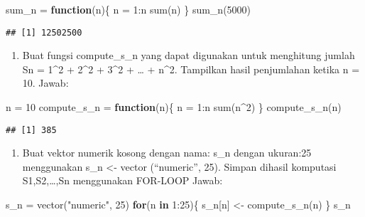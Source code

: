 \documentclass[
]{article}
\newenvironment{Shaded}{\begin{snugshade}}{\end{snugshade}}
\newcommand{\ControlFlowTok}[1]{\textcolor[rgb]{0.13,0.29,0.53}{\textbf{#1}}}
\newcommand{\DecValTok}[1]{\textcolor[rgb]{0.00,0.00,0.81}{#1}}
\newcommand{\FunctionTok}[1]{\textcolor[rgb]{0.00,0.00,0.00}{#1}}
\newcommand{\NormalTok}[1]{#1}
\newcommand{\OtherTok}[1]{\textcolor[rgb]{0.56,0.35,0.01}{#1}}
\newcommand{\SpecialCharTok}[1]{\textcolor[rgb]{0.00,0.00,0.00}{#1}}
\newcommand{\StringTok}[1]{\textcolor[rgb]{0.31,0.60,0.02}{#1}}
\providecommand{\tightlist}{%
  \setlength{\itemsep}{0pt}\setlength{\parskip}{0pt}}
\begin{document}
\begin{Shaded}
\begin{Highlighting}[]
\NormalTok{sum\_n }\OtherTok{=} \ControlFlowTok{function}\NormalTok{(n)\{}
\NormalTok{  n }\OtherTok{=} \DecValTok{1}\SpecialCharTok{:}\NormalTok{n }
    \FunctionTok{sum}\NormalTok{(n)}
\NormalTok{\}}
\FunctionTok{sum\_n}\NormalTok{(}\DecValTok{5000}\NormalTok{)}
\end{Highlighting}
\end{Shaded}

\begin{verbatim}
## [1] 12502500
\end{verbatim}

\begin{enumerate}
\def\labelenumi{\arabic{enumi}.}
\setcounter{enumi}{2}
\tightlist
\item
  Buat fungsi compute\_s\_n yang dapat digunakan untuk menghitung jumlah
  Sn = 1\^{}2 + 2\^{}2 + 3\^{}2 + \ldots{} + n\^{}2. Tampilkan hasil
  penjumlahan ketika n = 10. Jawab:
\end{enumerate}

\begin{Shaded}
\begin{Highlighting}[]
\NormalTok{n }\OtherTok{=} \DecValTok{10}
\NormalTok{compute\_s\_n }\OtherTok{=} \ControlFlowTok{function}\NormalTok{(n)\{}
\NormalTok{  n }\OtherTok{=} \DecValTok{1}\SpecialCharTok{:}\NormalTok{n}
  \FunctionTok{sum}\NormalTok{(n}\SpecialCharTok{\^{}}\DecValTok{2}\NormalTok{)}
\NormalTok{\}}
\FunctionTok{compute\_s\_n}\NormalTok{(n)}
\end{Highlighting}
\end{Shaded}

\begin{verbatim}
## [1] 385
\end{verbatim}

\begin{enumerate}
\def\labelenumi{\arabic{enumi}.}
\setcounter{enumi}{3}
\tightlist
\item
  Buat vektor numerik kosong dengan nama: s\_n dengan ukuran:25
  menggunakan s\_n \textless- vector (``numeric'', 25). Simpan dihasil
  komputasi S1,S2,\ldots,Sn menggunakan FOR-LOOP Jawab:
\end{enumerate}

\begin{Shaded}
\begin{Highlighting}[]
\NormalTok{s\_n }\OtherTok{=} \FunctionTok{vector}\NormalTok{(}\StringTok{"numeric"}\NormalTok{, }\DecValTok{25}\NormalTok{)}
\ControlFlowTok{for}\NormalTok{(n }\ControlFlowTok{in} \DecValTok{1}\SpecialCharTok{:}\DecValTok{25}\NormalTok{)\{}
\NormalTok{  s\_n[n] }\OtherTok{\textless{}{-}} \FunctionTok{compute\_s\_n}\NormalTok{(n)}
\NormalTok{\}}
\NormalTok{s\_n}
\end{Highlighting}
\end{Shaded}
\end{document}
